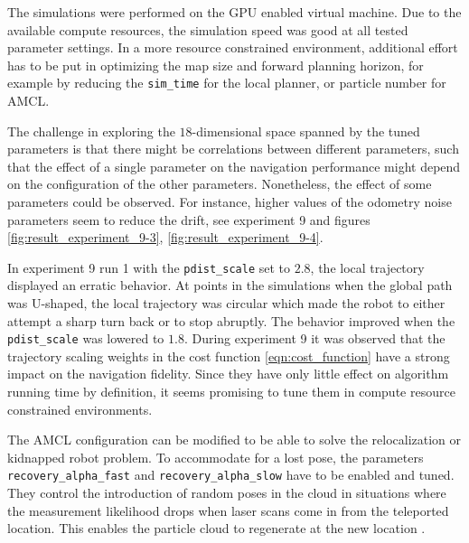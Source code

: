 \documentclass[10pt,journal,compsoc]{IEEEtran}
\begin{document}
The simulations were performed on the GPU enabled virtual machine. Due to the available compute resources, the simulation speed was good at all tested parameter settings. In a more resource constrained environment, additional effort has to be put in optimizing the map size and forward planning horizon, for example by reducing the \texttt{sim\_time} for the local planner, or particle number for AMCL.

The challenge in exploring the $18$-dimensional space spanned by the tuned parameters is that there might be correlations between different parameters, such that the effect of a single parameter on the navigation performance might depend on the configuration of the other parameters. Nonetheless, the effect of some parameters could be observed. For instance, higher values of the odometry noise parameters seem to reduce the drift, see experiment 9 and figures \ref{fig:result_experiment_9-3}, \ref{fig:result_experiment_9-4}.

In experiment 9 run 1 with the \texttt{pdist\_scale} set to $2.8$, the local trajectory displayed an erratic behavior. At points in the simulations when the global path was U-shaped, the local trajectory was circular which made the robot to either attempt a sharp turn back or to stop abruptly. The behavior improved when the \texttt{pdist\_scale} was lowered to $1.8$. During experiment 9 it was observed that the trajectory scaling weights in the cost function \ref{eqn:cost_function} have a strong impact on the navigation fidelity. Since they have only little effect on algorithm running time by definition, it seems promising to tune them in compute resource constrained environments.


The AMCL configuration can be modified to be able to solve the relocalization or kidnapped robot problem. To accommodate for a lost pose, the parameters \texttt{recovery\_alpha\_fast} and  \texttt{recovery\_alpha\_slow} have to be enabled and tuned. They control the introduction of random poses in the cloud in situations where the measurement likelihood drops when laser scans come in from the teleported location. This enables the particle cloud to regenerate at the new location \cite{ros_wiki_amcl}.
\end{document}
